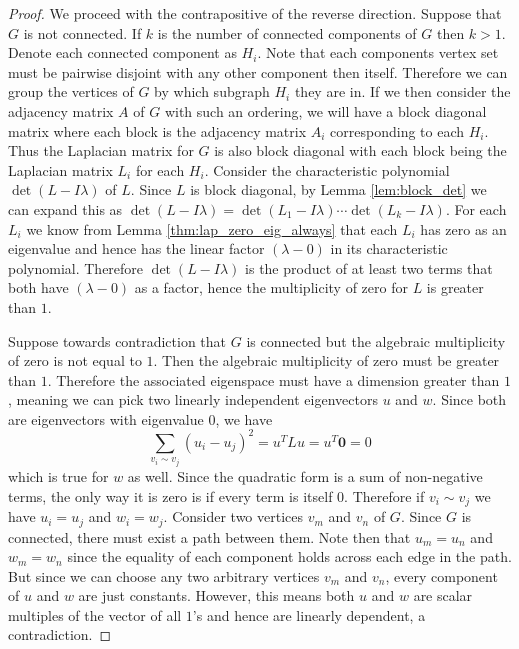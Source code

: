 \documentclass[11pt]{article}
\begin{document}
\begin{proof}
    We proceed with the contrapositive of the reverse direction. Suppose that $G$ is not connected. If $k$ is the number of connected components of $G$ then $k > 1$. Denote each connected component as $H_i$. Note that each components vertex set must be pairwise disjoint with any other component then itself. Therefore we can group the vertices of $G$ by which subgraph $H_i$ they are in. If we then consider the adjacency matrix $A$ of $G$ with such an ordering, we will have a block diagonal matrix where each block is the adjacency matrix $A_i$ corresponding to each $H_i$. Thus the Laplacian matrix for $G$ is also block diagonal with each block being the Laplacian matrix $L_i$ for each $H_i$. Consider the characteristic polynomial $\det(L - I\lambda)$ of $L$. Since $L$ is block diagonal, by Lemma \ref{lem:block_det} we can expand this as $\det(L - I\lambda) = \det(L_1 - I\lambda) \cdots \det(L_k - I \lambda)$. For each $L_i$ we know from Lemma \ref{thm:lap_zero_eig_always} that each $L_i$ has zero as an eigenvalue and hence has the linear factor $(\lambda-0)$ in its characteristic polynomial. Therefore $\det(L - I\lambda)$ is the product of at least two terms that both have $(\lambda-0)$ as a factor, hence the multiplicity of zero for $L$ is greater than $1$.

    Suppose towards contradiction that $G$ is connected but the algebraic multiplicity of zero is not equal to $1$. Then the algebraic multiplicity of zero must be greater than $1$. Therefore the associated eigenspace must have a dimension greater than $1$, meaning we can pick two linearly independent eigenvectors $u$ and $w$. Since both are eigenvectors with eigenvalue $0$, we have
    \[
        \sum_{v_i \sim v_j} (u_i - u_j)^2 = u^T L u = u^T \mathbf{0} = 0
    \]
    which is true for $w$ as well. Since the quadratic form is a sum of non-negative terms, the only way it is zero is if every term is itself $0$. Therefore if $v_i \sim v_j$ we have $u_i = u_j$ and $w_i = w_j$. Consider two vertices $v_m$ and $v_n$ of $G$. Since $G$ is connected, there must exist a path between them. Note then that $u_m = u_n$ and $w_m = w_n$ since the equality of each component holds across each edge in the path. But since we can choose any two arbitrary vertices $v_m$ and $v_n$, every component of $u$ and $w$ are just constants. However, this means both $u$ and $w$ are scalar multiples of the vector of all $1$'s and hence are linearly dependent, a contradiction.
\end{proof}
\end{document}
